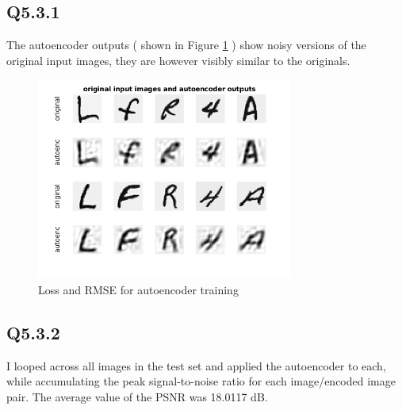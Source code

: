 \documentclass[12pt]{article}
\begin{document}
\subsection{Q5.3.1}
The autoencoder outputs ( shown in Figure \ref{fig:autoencout} ) show noisy versions of the original input images, they are however visibly similar to the originals.

\begin{figure}[H]
\centering
\includegraphics[page=1,width=0.75\textwidth]{q531_auto}
\caption{ Loss and RMSE for autoencoder training } 
\label{fig:autoencout}
\end{figure}   

\subsection{Q5.3.2}
I looped across all images in the test set and applied the autoencoder to each, while accumulating the peak signal-to-noise ratio for each image/encoded image pair.  The average value of the PSNR was 18.0117 dB.
\end{document}
